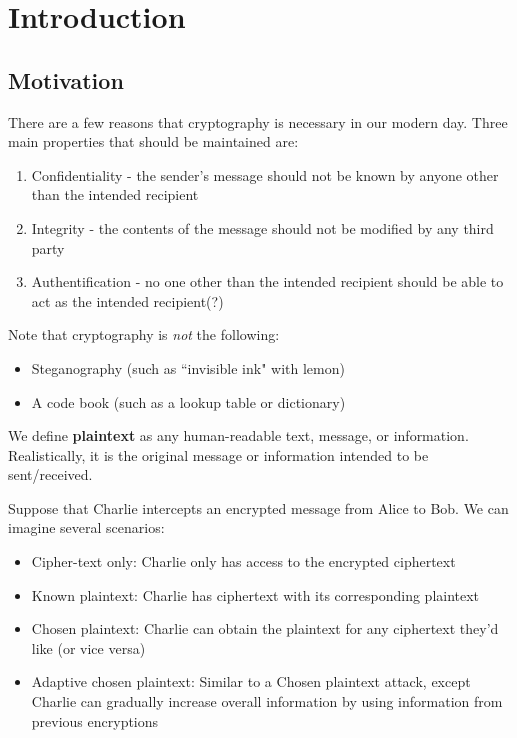 \documentclass{article}
\begin{document}
\cover
\toc
\blurb


\section{Introduction}
\subsection{Motivation}

There are a few reasons that cryptography is necessary in our modern day.
Three main properties that should be maintained are:
\begin{enumerate}
    \item Confidentiality - the sender's message should not be known by anyone other than the intended recipient
    \item Integrity - the contents of the message should not be modified by any third party
    \item Authentification - no one other than the intended recipient should be able to act as the intended recipient(?)
\end{enumerate}

Note that cryptography is \textit{not} the following:
\begin{itemize}
    \item Steganography (such as ``invisible ink" with lemon)
    \item A code book (such as a lookup table or dictionary)
\end{itemize}

\begin{defn}
We define \textbf{plaintext} as any human-readable text, message, or information.
Realistically, it is the original message or information intended to be sent/received.
\end{defn}

Suppose that Charlie intercepts an encrypted message from Alice to Bob.
We can imagine several scenarios:
\begin{itemize}
    \item Cipher-text only: Charlie only has access to the encrypted ciphertext
    \item Known plaintext: Charlie has ciphertext with its corresponding plaintext
    \item Chosen plaintext: Charlie can obtain the plaintext for any ciphertext they'd like (or vice versa)
    \item Adaptive chosen plaintext: Similar to a Chosen plaintext attack, except Charlie can gradually increase overall information by using information from previous encryptions
\end{itemize}
\end{document}
